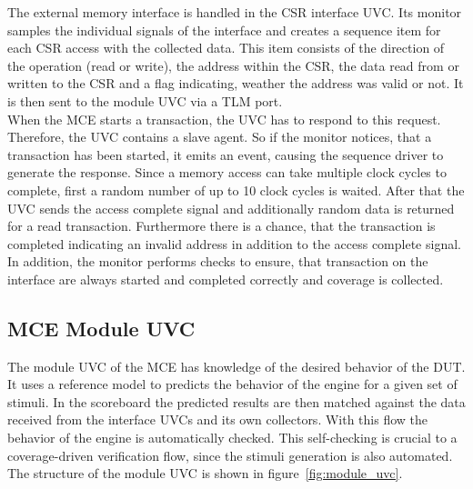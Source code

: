 The external memory interface is handled in the CSR interface UVC.
Its monitor samples the individual signals of the interface and creates a sequence item for each CSR access with the collected data.
This item consists of the direction of the operation (read or write), the address within the CSR, the data read from or written to the CSR and a flag
indicating, weather the address was valid or not. 
It is then sent to the module UVC via a TLM port.\\
When the MCE starts a transaction, the UVC has to respond to this request.
Therefore, the UVC contains a slave agent.
So if the monitor notices, that a transaction has been started, it emits an event, causing the sequence driver to generate the response.
Since a memory access can take multiple clock cycles to complete, first a random number of up to 10 clock cycles is waited.
After that the UVC sends the access complete signal and additionally random data is returned for a read transaction.
Furthermore there is a chance, that the transaction is completed indicating an invalid address in addition to the access complete signal.
In addition, the monitor performs checks to ensure, that transaction on the interface are always started and completed correctly and coverage is collected.

\subsection{MCE Module UVC}

The module UVC of the MCE has knowledge of the desired behavior of the DUT.
It uses a reference model to predicts the behavior of the engine for a given set of stimuli.
In the scoreboard the predicted results are then matched against the data received from the interface UVCs and its own collectors.
With this flow the behavior of the engine is automatically checked.
This self-checking is crucial to a coverage-driven verification flow, since the stimuli generation is also automated.
The structure of the module UVC is shown in figure~\ref{fig:module_uvc}.

